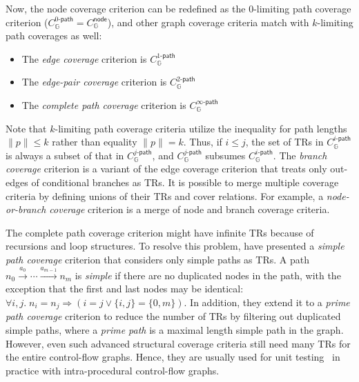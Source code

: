 \documentclass[acmsmall,review,screen]{acmart}
\newcommand{\name}[1]{\textsf{#1}}
\newcommand{\graph}{\mathbb{G}}
\newcommand{\node}{n}
\newcommand{\edge}[1]{\xrightarrow{#1}}
\newcommand{\annot}{a}
\newcommand{\pat}{p}
\newcommand{\cov}[1]{C_{#1}}
\newcommand{\nodecov}[1]{\cov{#1}^{\name{node}}}
\newcommand{\kpathcov}[2]{\cov{#2}^{{#1}\name{-path}}}
\newcommand{\norm}[1]{\lVert{#1}\rVert}
\begin{document}
Now, the node coverage criterion can be redefined as the 0-limiting path
coverage criterion ($\kpathcov{0}{\graph} = \nodecov{\graph}$), and other graph
coverage criteria match with $k$-limiting path coverages as well:
\begin{itemize}
  \item The \textit{edge coverage} criterion is $\kpathcov{1}{\graph}$
  \item The \textit{edge-pair coverage} criterion is $\kpathcov{2}{\graph}$
  \item The \textit{complete path coverage} criterion is
    $\kpathcov{\infty}{\graph}$
\end{itemize}
%
Note that $k$-limiting path coverage criteria utilize the inequality for path
lengths $\norm{\pat} \leq k$ rather than equality $\norm{\pat} = k$.
%
Thus, if $i \leq j$, the set of TRs in $\kpathcov{i}{\graph}$ is always a subset
of that in $\kpathcov{j}{\graph}$, and $\kpathcov{j}{\graph}$ subsumes
$\kpathcov{i}{\graph}$.
%
The \textit{branch coverage} criterion is a variant of the edge coverage
criterion that treats only out-edges of conditional branches as TRs.
%
It is possible to merge multiple coverage criteria by defining unions of their
TRs and cover relations.
%
For example, a \textit{node-or-branch coverage} criterion is a merge
of node and branch coverage criteria.


The complete path coverage criterion might have infinite TRs because of
recursions and loop structures.
%
To resolve this problem, \citet{cov-def} have presented a \textit{simple path
coverage} criterion that considers only simple paths as TRs.
%
A path $\node_0 \edge{\annot_0} \cdots \edge{\annot_{m-1}} \node_m$ is
\textit{simple} if there are no duplicated nodes in the path, with the exception that the
first and last nodes may be identical: $\forall i, j. \; \node_i = \node_j
\Rightarrow (i = j \vee \{ i, j \} = \{ 0, m \})$.
%
In addition, they extend it to a \textit{prime path coverage} criterion to
reduce the number of TRs by filtering out duplicated simple paths, where a
\textit{prime path} is a maximal length simple path in the graph.
%
However, even such advanced structural coverage criteria still need many
TRs for the entire control-flow graphs.
%
Hence, they are usually used for unit testing~\cite{unit-test} in practice
with intra-procedural control-flow graphs.

\end{document}
